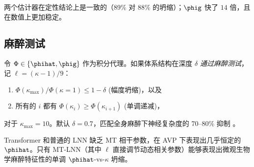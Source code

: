 两个估计器在定性结论上是一致的（89\% 对 88\% 的坍缩）；$\phig$ 快了 $14$ 倍，且在数值上更加稳定。

\subsection{麻醉测试}
\begin{definition}[麻醉测试]
令 $\Phi\in\{\phihat,\phig\}$ 作为积分代理。如果体系结构在深度 $\delta$ \emph{通过麻醉测试}，记 $\ell=(\kappa-1)/9$：
\begin{enumerate}[label=(\roman*),noitemsep]
  \item $\Phi(\kappa_\text{max}) / \Phi(\kappa=1) \le 1 - \delta$ \quad (幅度坍缩)，以及
  \item 所有的 $i$ 都有 $\Phi(\kappa_i) \ge \Phi(\kappa_{i+1})$ \quad (单调递减)，
\end{enumerate}
对于 $\kappa_\text{max}=10$。默认 $\delta=0.7$，匹配全身麻醉下神经复杂度的 70--80\% 抑制 \citep{casali2013thecover}。
\end{definition}

Transformer 和普通的 LNN 缺乏 MT 相干参数，在 AVP 下表现出几乎恒定的 $\phihat$。只有 MT-LNN（其中 $\ell$ 直接调节动态相关参数）能够表现出微观生物学麻醉特征性的单调 $\phihat$-vs-$\kappa$ 坍缩。

